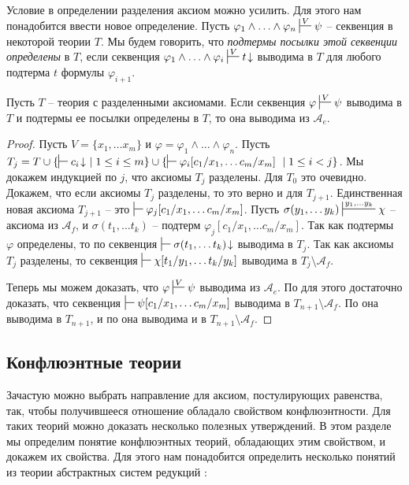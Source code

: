 \documentclass[reqno]{amsart}
\theoremstyle{definition}
\theoremstyle{remark}
\begin{document}
Условие в определении разделения аксиом можно усилить.
Для этого нам понадобится ввести новое определение.
Пусть $\varphi_1 \land \ldots \land \varphi_n \sststile{}{V} \psi$ -- секвенция в некоторой теории $T$.
Мы будем говорить, что \emph{подтермы посылки этой секвенции определены} в $T$,
если секвенция $\varphi_1 \land \ldots \land \varphi_i \sststile{}{V} t\!\downarrow$ выводима в $T$ для любого подтерма $t$ формулы $\varphi_{i+1}$.

\begin{prop}
Пусть $T$ -- теория с разделенными аксиомами.
Если секвенция $\varphi \sststile{}{V} \psi$ выводима в $T$ и подтермы ее посылки определены в $T$, то она выводима из $\mathcal{A}_e$.
\end{prop}
\begin{proof}
Пусть $V = \{ x_1, \ldots x_m \}$ и $\varphi = \varphi_1 \land \ldots \land \varphi_n$.
Пусть $T_j = T \cup \{ \sststile{}{} c_i\!\downarrow\ \mid 1 \leq i \leq m \} \cup \{ \sststile{}{} \varphi_i[c_1/x_1, \ldots c_m/x_m]\ \mid 1 \leq i < j \}$.
Мы докажем индукцией по $j$, что аксиомы $T_j$ разделены.
Для $T_0$ это очевидно.
Докажем, что если аксиомы $T_j$ разделены, то это верно и для $T_{j+1}$.
Единственная новая аксиома $T_{j+1}$ -- это $\sststile{}{} \varphi_j[c_1/x_1, \ldots c_m/x_m]$.
Пусть $\sigma(y_1, \ldots y_k) \sststile{}{y_1, \ldots y_k} \chi$ -- аксиома из $\mathcal{A}_f$, и $\sigma(t_1, \ldots t_k)$ -- подтерм $\varphi_j[c_1/x_1, \ldots c_m/x_m]$.
Так как подтермы $\varphi$ определены, то по  секвенция $\sststile{}{} \sigma(t_1, \ldots t_k)\!\downarrow$ выводима в $T_j$.
Так как аксиомы $T_j$ разделены, то секвенция $\sststile{}{} \chi[t_1/y_1, \ldots t_k/y_k]$ выводима в $T_j \setminus \mathcal{A}_f$.

Теперь мы можем доказать, что $\varphi \sststile{}{V} \psi$ выводима из $\mathcal{A}_e$.
По  для этого достаточно доказать, что секвенция $\sststile{}{} \psi[c_1/x_1, \ldots c_m/x_m]$ выводима в $T_{n+1} \setminus \mathcal{A}_f$.
По  она выводима в $T_{n+1}$, и по  она выводима и в $T_{n+1} \setminus \mathcal{A}_f$.
\end{proof}

\subsection{Конфлюэнтные теории}

Зачастую можно выбрать направление для аксиом, постулирующих равенства, так, чтобы получившееся отношение обладало свойством конфлюэнтности.
Для таких теорий можно доказать несколько полезных утверждений.
В этом разделе мы определим понятие конфлюэнтных теорий, обладающих этим свойством, и докажем их свойства.
Для этого нам понадобится определить несколько понятий из теории абстрактных систем редукций \cite{Terese,klop-trs,ohlebusch-advanced}:
\end{document}
